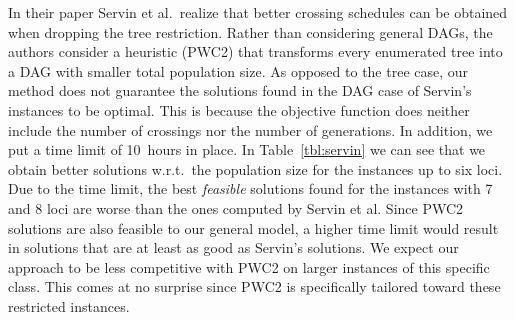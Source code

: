 \documentclass[runningheads]{llncs}
\begin{document}
In their paper Servin et al.\ realize that better crossing schedules can be obtained when dropping the tree restriction. Rather than considering general DAGs, the authors consider a heuristic (PWC2) that transforms every enumerated tree into a DAG with smaller total population size. As opposed to the tree case, our method does not guarantee the solutions found in the DAG case of Servin's instances to be optimal. This is because the objective function does neither include the number of crossings nor the number of generations. In addition, we put a time limit of 10~hours in place. In Table~\ref{tbl:servin} we can see that we obtain better solutions w.r.t.\ the population size for the instances up to six loci. Due to the time limit, the best \emph{feasible} solutions found for the instances with 7 and 8 loci are worse than the ones computed by Servin et al. Since PWC2 solutions are also feasible to our general model, a higher time limit would result in solutions that are at least as good as Servin's solutions. We expect our approach to be less competitive with PWC2 on larger instances of this specific class. This comes at no surprise since PWC2 is specifically tailored toward these restricted instances.
\end{document}
